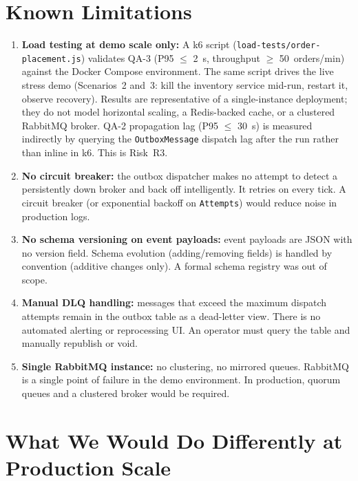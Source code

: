 \section{Known Limitations}

\begin{enumerate}
    \item \textbf{Load testing at demo scale only:} A k6 script (\texttt{load-tests/order-placement.js}) validates QA-3 (P95 $\leq$ 2~s, throughput $\geq$ 50~orders/min) against the Docker Compose environment. The same script drives the live stress demo (Scenarios~2 and~3: kill the inventory service mid-run, restart it, observe recovery). Results are representative of a single-instance deployment; they do not model horizontal scaling, a Redis-backed cache, or a clustered RabbitMQ broker. QA-2 propagation lag (P95 $\leq$ 30~s) is measured indirectly by querying the \texttt{OutboxMessage} dispatch lag after the run rather than inline in k6. This is Risk~R3.
    \item \textbf{No circuit breaker:} the outbox dispatcher makes no attempt to detect a persistently down broker and back off intelligently. It retries on every tick. A circuit breaker (or exponential backoff on \texttt{Attempts}) would reduce noise in production logs.
    \item \textbf{No schema versioning on event payloads:} event payloads are JSON with no version field. Schema evolution (adding/removing fields) is handled by convention (additive changes only). A formal schema registry was out of scope.
    \item \textbf{Manual DLQ handling:} messages that exceed the maximum dispatch attempts remain in the outbox table as a dead-letter view. There is no automated alerting or reprocessing UI. An operator must query the table and manually republish or void.
    \item \textbf{Single RabbitMQ instance:} no clustering, no mirrored queues. RabbitMQ is a single point of failure in the demo environment. In production, quorum queues and a clustered broker would be required.
\end{enumerate}

\section{What We Would Do Differently at Production Scale}

